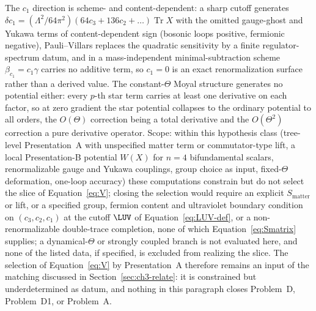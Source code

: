 The \(c_1\) direction is scheme- and content-dependent: a sharp cutoff generates \(\delta c_1=(\Lambda^2/64\pi^2)(64c_3+136c_2+\ldots)\operatorname{Tr}X\) with the omitted gauge-ghost and Yukawa terms of content-dependent sign (bosonic loops positive, fermionic negative), Pauli--Villars replaces the quadratic sensitivity by a finite regulator-spectrum datum, and in a mass-independent minimal-subtraction scheme \(\beta_{c_1}=c_1\gamma\) carries no additive term, so \(c_1=0\) is an exact renormalization surface rather than a derived value.
The constant-\(\Theta\) Moyal structure generates no potential either: every \(p\)-th star term carries at least one derivative on each factor, so at zero gradient the star potential collapses to the ordinary potential to all orders, the \(O(\Theta)\) correction being a total derivative and the \(O(\Theta^2)\) correction a pure derivative operator.
Scope: within this hypothesis class (tree-level Presentation~A with unspecified matter term or commutator-type lift, a local Presentation-B potential \(W(X)\) for \(n=4\) bifundamental scalars, renormalizable gauge and Yukawa couplings, group choice as input, fixed-\(\Theta\) deformation, one-loop accuracy) these computations constrain but do not select the slice of Equation~\eqref{eq:V}; closing the selection would require an explicit \(S_{\mathrm{matter}}\) or lift, or a specified group, fermion content and ultraviolet boundary condition on \((c_3,c_2,c_1)\) at the cutoff \(\LUV\) of Equation~\eqref{eq:LUV-def}, or a non-renormalizable double-trace completion, none of which Equation~\eqref{eq:Smatrix} supplies; a dynamical-\(\Theta\) or strongly coupled branch is not evaluated here, and none of the listed data, if specified, is excluded from realizing the slice.
The selection of Equation~\eqref{eq:V} by Presentation~A therefore remains an input of the matching discussed in Section~\ref{sec:ch3-relate}: it is constrained but underdetermined as datum, and nothing in this paragraph closes Problem~D, Problem~D1, or Problem~A.
